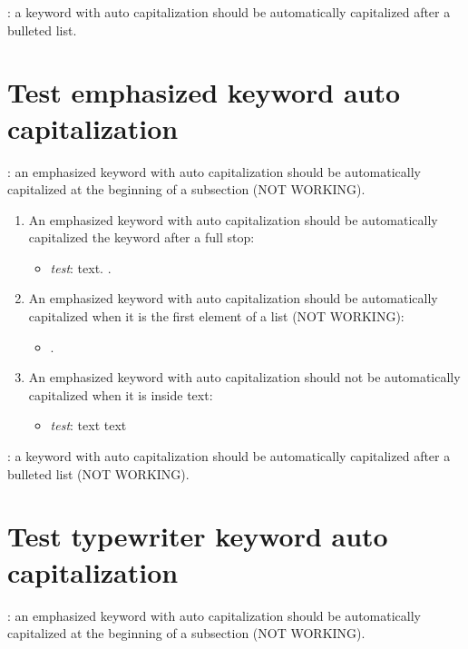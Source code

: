 \autocapKeywordExample: a keyword with auto capitalization should be automatically capitalized after a bulleted list.

\section{Test emphasized keyword auto capitalization}

\autocapEmphKeywordExample: an emphasized keyword with auto capitalization should be automatically capitalized at the beginning of a subsection (NOT WORKING).

\begin{enumerate}

\item An emphasized keyword with auto capitalization should be automatically capitalized the keyword after a full stop:
\begin{itemize}
\item \textit{test}: text. \autocapEmphKeywordExample.
\end{itemize}

\item An emphasized keyword with auto capitalization should be automatically capitalized when it is the first element of a list (NOT WORKING):
\begin{itemize}
\item \autocapEmphKeywordExample.
\end{itemize}

\item An emphasized keyword with auto capitalization should not be automatically capitalized when it is inside text:
\begin{itemize}
\item \textit{test}: text \autocapEmphKeywordExample text
\end{itemize}

\end{enumerate}

\autocapEmphKeywordExample: a keyword with auto capitalization should be automatically capitalized after a bulleted list (NOT WORKING).

\section{Test typewriter keyword auto capitalization}

\autocapEmphKeywordExample: an emphasized keyword with auto capitalization should be automatically capitalized at the beginning of a subsection (NOT WORKING).

